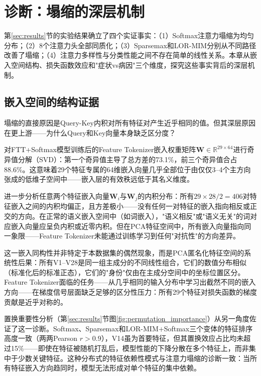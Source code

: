 
\section{诊断：塌缩的深层机制}
\label{sec:diagnosis}

第\ref{sec:results}节的实验结果确立了四个实证事实：（1）Softmax注意力塌缩为均匀分布；（2）8个注意力头全部同质化；（3）Sparsemax和LOR-MIM分别从不同路径改善了塌缩；（4）注意力多样性与分类性能之间不存在简单的线性关系。本章从嵌入空间结构、损失函数效应和"症状vs病因"三个维度，探究这些事实背后的深层机制。

\subsection{嵌入空间的结构证据}
\label{subsec:embedding_svd}

塌缩的直接原因是Query-Key内积对所有特征对产生近乎相同的值。但其深层原因在更上游——为什么Query和Key向量本身缺乏区分度？

对FTT+Softmax模型训练后的Feature Tokenizer嵌入权重矩阵$\mathbf{W} \in \mathbb{R}^{29 \times 64}$进行奇异值分解（SVD）：第一个奇异值主导了总方差的73.1\%，前三个奇异值合占88.6\%。这意味着29个特征专属的64维嵌入向量几乎全部位于由仅仅3--4个主方向张成的低维子空间中——嵌入层的有效秩远低于其名义维度。

进一步分析任意两个特征嵌入向量$\mathbf{W}_i$与$\mathbf{W}_j$的内积分布：所有$29 \times 28 / 2 = 406$对特征嵌入之间的内积均偏正，且方差极小——没有任何一对特征的嵌入指向相反或正交的方向。在正常的语义嵌入空间中（如词嵌入），"语义相反"或"语义无关"的词对应嵌入向量应呈负内积或近零内积。但在PCA特征空间中，所有嵌入向量指向同一象限——Feature Tokenizer未能通过训练学习到任何"对抗性"的方向差异。

这一嵌入同构性并非特定于本数据集的偶然现象，而是PCA匿名化特征空间的系统性后果：所有V1--V28是同一组主成分的不同线性组合，它们的数值分布相似（标准化后的标准正态），它们的"身份"仅由在主成分空间中的坐标位置区分。Feature Tokenizer面临的任务——从几乎相同的输入分布中学习出截然不同的嵌入方向——在梯度信号层面缺乏足够的区分性压力：所有29个特征对损失函数的梯度贡献是近乎对称的。

置换重要性分析（第\ref{sec:results}节图\ref{fig:permutation_importance}）从另一角度佐证了这一诊断。Softmax、Sparsemax和LOR-MIM+Softmax三个变体的特征排序高度一致（两两Pearson $r > 0.9$），V14虽为首要特征，但其置换效应占比均未超过15\%——即使在特征被随机打乱后，模型性能的下降分散在多个特征上，而非集中于少数关键特征。这种分布式的特征依赖性模式与注意力塌缩的诊断一致：当所有特征嵌入方向趋同时，模型无法形成对单个特征的集中依赖。

